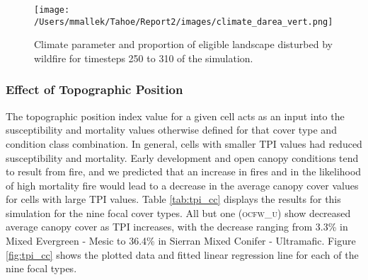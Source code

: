 \begin{figure}[!htbp]
\centering
\texttt{[image: /Users/mmallek/Tahoe/Report2/images/climate\_darea\_vert.png]}
\caption{Climate parameter and proportion of eligible landscape disturbed by wildfire for timesteps 250 to 310 of the simulation.}
\label{fig:compare_clim_darea}
\end{figure}

\clearpage
\subsubsection{Effect of Topographic Position} 

The topographic position index value for a given cell acts as an input into the susceptibility and mortality values otherwise defined for that cover type and condition class combination. In general, cells with smaller TPI values had reduced susceptibility and mortality. Early development and open canopy conditions tend to result from fire, and we predicted that an increase in fires and in the likelihood of high mortality fire would lead to a decrease in the average canopy cover values for cells with large TPI values. Table \ref{tab:tpi_cc} displays the results for this simulation for the nine focal cover types. All but one (\textsc{ocfw\_u}) show decreased average canopy cover as TPI increases, with the decrease ranging from 3.3\% in Mixed Evergreen - Mesic to 36.4\% in Sierran Mixed Conifer - Ultramafic. Figure \ref{fig:tpi_cc} shows the plotted data and fitted linear regression line for each of the nine focal types. 

